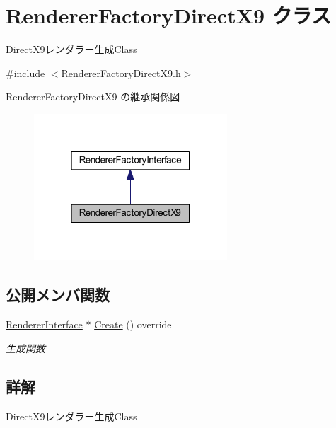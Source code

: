 \hypertarget{class_renderer_factory_direct_x9}{}\section{Renderer\+Factory\+Direct\+X9 クラス}
\label{class_renderer_factory_direct_x9}


Direct\+X9レンダラー生成\+Class  




{\ttfamily \#include $<$Renderer\+Factory\+Direct\+X9.\+h$>$}



Renderer\+Factory\+Direct\+X9 の継承関係図\nopagebreak
\begin{figure}[H]
\begin{center}
\leavevmode
\includegraphics[width=205pt]{class_renderer_factory_direct_x9__inherit__graph}
\end{center}
\end{figure}
\subsection*{公開メンバ関数}
\begin{DoxyCompactItemize}
\item 
\mbox{\hyperlink{class_renderer_interface}{Renderer\+Interface}} $\ast$ \mbox{\hyperlink{class_renderer_factory_direct_x9_aa64ac54f3efe121f531a28dd3b7690e3}{Create}} () override
\begin{DoxyCompactList}\small\item\em 生成関数 \end{DoxyCompactList}\end{DoxyCompactItemize}


\subsection{詳解}
Direct\+X9レンダラー生成\+Class 

